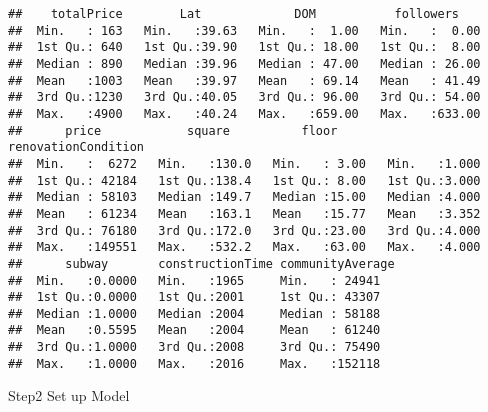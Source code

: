 \documentclass[
]{article}
\newenvironment{Shaded}{\begin{snugshade}}{\end{snugshade}}
\newcommand{\FunctionTok}[1]{\textcolor[rgb]{0.00,0.00,0.00}{#1}}
\newcommand{\NormalTok}[1]{#1}
\newcommand{\OtherTok}[1]{\textcolor[rgb]{0.56,0.35,0.01}{#1}}
\newcommand{\SpecialCharTok}[1]{\textcolor[rgb]{0.00,0.00,0.00}{#1}}
\begin{document}
\begin{verbatim}
##    totalPrice        Lat             DOM           followers     
##  Min.   : 163   Min.   :39.63   Min.   :  1.00   Min.   :  0.00  
##  1st Qu.: 640   1st Qu.:39.90   1st Qu.: 18.00   1st Qu.:  8.00  
##  Median : 890   Median :39.96   Median : 47.00   Median : 26.00  
##  Mean   :1003   Mean   :39.97   Mean   : 69.14   Mean   : 41.49  
##  3rd Qu.:1230   3rd Qu.:40.05   3rd Qu.: 96.00   3rd Qu.: 54.00  
##  Max.   :4900   Max.   :40.24   Max.   :659.00   Max.   :633.00  
##      price            square          floor       renovationCondition
##  Min.   :  6272   Min.   :130.0   Min.   : 3.00   Min.   :1.000      
##  1st Qu.: 42184   1st Qu.:138.4   1st Qu.: 8.00   1st Qu.:3.000      
##  Median : 58103   Median :149.7   Median :15.00   Median :4.000      
##  Mean   : 61234   Mean   :163.1   Mean   :15.77   Mean   :3.352      
##  3rd Qu.: 76180   3rd Qu.:172.0   3rd Qu.:23.00   3rd Qu.:4.000      
##  Max.   :149551   Max.   :532.2   Max.   :63.00   Max.   :4.000      
##      subway       constructionTime communityAverage
##  Min.   :0.0000   Min.   :1965     Min.   : 24941  
##  1st Qu.:0.0000   1st Qu.:2001     1st Qu.: 43307  
##  Median :1.0000   Median :2004     Median : 58188  
##  Mean   :0.5595   Mean   :2004     Mean   : 61240  
##  3rd Qu.:1.0000   3rd Qu.:2008     3rd Qu.: 75490  
##  Max.   :1.0000   Max.   :2016     Max.   :152118
\end{verbatim}

Step2 Set up Model

\begin{Shaded}
\end{Shaded}
\end{document}
